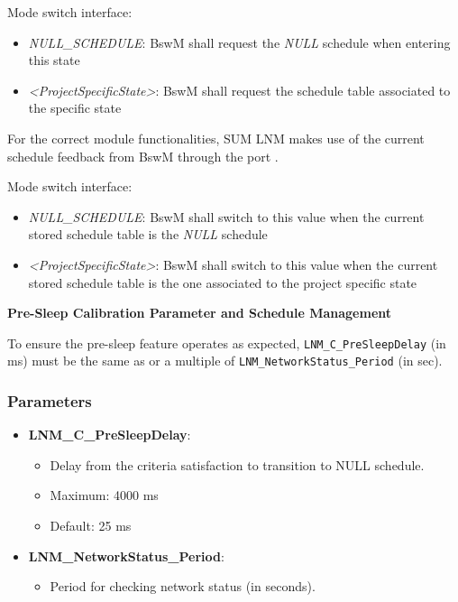 Mode switch interface:
\begin{itemize}
\item \textit{NULL\_SCHEDULE}: BswM shall request the 	\textit{NULL} schedule when entering this state
\item \textit{<ProjectSpecificState>}: BswM shall request the schedule table associated to the specific state
\end{itemize}


For the correct module functionalities, SUM LNM makes use of the current schedule feedback from BswM through the port .


Mode switch interface:
\begin{itemize}
\item \textit{NULL\_SCHEDULE}: BswM shall switch to this value when the current stored schedule table is the \textit{NULL} schedule
\item \textit{<ProjectSpecificState>}: BswM shall switch to this value when the current stored schedule table is the one associated to the project specific state
\end{itemize}

\textbf{Pre-Sleep Calibration Parameter and Schedule Management}

To ensure the pre-sleep feature operates as expected, \texttt{LNM\_C\_PreSleepDelay} (in ms) must be the same as or a multiple of \texttt{LNM\_NetworkStatus\_Period} (in sec).

\subsubsection*{Parameters}

\begin{itemize}
    \item \textbf{LNM\_C\_PreSleepDelay}:
    \begin{itemize}
        \item Delay from the criteria satisfaction to transition to NULL schedule.
        \item Maximum: 4000 ms
        \item Default: 25 ms
    \end{itemize}
    \item \textbf{LNM\_NetworkStatus\_Period}:
    \begin{itemize}
        \item Period for checking network status (in seconds).
    \end{itemize}
\end{itemize}


